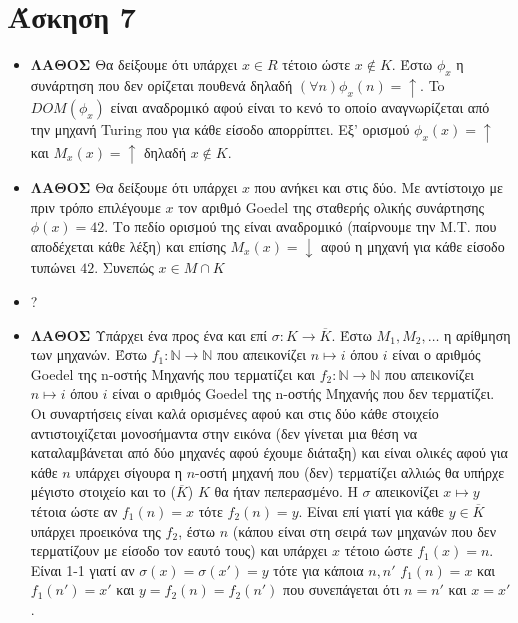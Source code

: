 \documentclass[11pt]{article}
\begin{document}

\section*{Άσκηση 7}
\begin{itemize}
  \item \textbf{ΛΑΘΟΣ} Θα δείξουμε ότι υπάρχει $x\in R$ τέτοιο ώστε $x\notin K$. Έστω
    $\phi_x$ η συνάρτηση που δεν ορίζεται πουθενά δηλαδή $(\forall n)\phi_x(n)=\uparrow$. To 
    $DOM(\phi_x)$ είναι αναδρομικό αφού είναι το κενό το οποίο αναγνωρίζεται από την μηχανή
    Turing που για κάθε είσοδο απορρίπτει. Εξ' ορισμού $\phi_x(x)=\uparrow$ και $M_x(x)=\uparrow$
    δηλαδή $x\notin K$.
  \item \textbf{ΛΑΘΟΣ} Θα δείξουμε ότι υπάρχει $x$ που ανήκει και στις δύο. Με αντίστοιχο με πριν
    τρόπο επιλέγουμε $x$ τον αριθμό Goedel της σταθερής ολικής συνάρτησης $\phi(x)=42$. Το πεδίο
    ορισμού της είναι αναδρομικό (παίρνουμε την Μ.T. που αποδέχεται κάθε λέξη) και επίσης $M_x(x)=\downarrow$
    αφού η μηχανή για κάθε είσοδο τυπώνει $42$. Συνεπώς $x\in M\cap K$ 
  \item ?
  \item \textbf{ΛΑΘΟΣ} Υπάρχει ένα προς ένα και επί $\sigma:K\rightarrow\overline{K}$. Έστω $M_1,M_2,\ldots$
    η αρίθμηση των μηχανών. Έστω $f_1:\mathbb{N}\rightarrow \mathbb{N}$ που απεικονίζει $n\mapsto i$ όπου $i$ είναι 
    ο αριθμός Goedel της n-οστής Μηχανής που τερματίζει και $f_2:\mathbb{N}\rightarrow \mathbb{N}$ που απεικονίζει
    $n\mapsto i$ όπου $i$ είναι ο αριθμός Goedel της n-οστής Μηχανής που δεν τερματίζει. Οι συναρτήσεις είναι καλά
    ορισμένες αφού και στις δύο κάθε στοιχείο αντιστοιχίζεται μονοσήμαντα στην εικόνα (δεν γίνεται μια θέση να 
    καταλαμβάνεται από δύο μηχανές αφού έχουμε διάταξη)
    και είναι ολικές αφού για κάθε $n$ υπάρχει σίγουρα η $n$-οστή μηχανή που (δεν)
    τερματίζει αλλιώς θα υπήρχε μέγιστο στοιχείο και το ($\overline{K}$) $K$ θα ήταν πεπερασμένο. 
    Η $\sigma$ απεικονίζει $x\mapsto y$ τέτοια ώστε αν $f_1(n)=x$ τότε $f_2(n)=y$. Είναι επί γιατί για κάθε 
    $y\in\overline{K}$ υπάρχει προεικόνα της $f_2$, έστω $n$ (κάπου είναι στη σειρά των μηχανών που δεν τερματίζουν με είσοδο τον
    εαυτό τους) και υπάρχει $x$ τέτοιο ώστε $f_1(x) = n$. Είναι 1-1 γιατί αν $\sigma(x)=\sigma(x')=y$ τότε για κάποια $n,n'$ 
    $f_1(n)=x$ και $f_1(n')=x'$ και $y=f_2(n)=f_2(n')$ που συνεπάγεται ότι $n=n'$ και $x=x'$.
\end{itemize}
\end{document}
